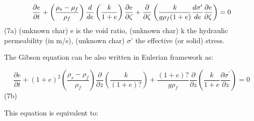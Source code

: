\begin{equation*}
\dfrac{\partial e}{\partial t} +\left( \dfrac{\rho _{s} -\rho _{f} }{\rho
_{f} } \right) \dfrac{d}{de} \left( \dfrac{k}{1+e} \right) \dfrac{\partial e%
}{\partial \zeta } +\dfrac{\partial }{\partial \zeta } \left( \dfrac{k}{%
g\rho _{f} (1+e)} \dfrac{d\sigma ^{\prime }}{de} \dfrac{\partial e}{\partial
\zeta } \right) =0 
\end{equation*}%
\hspace{5mm} \hspace{5mm} \hspace{5mm} \hspace{5mm} (7a)\newline
(unknown char)\hspace{5mm} e is the void ratio, \newline
(unknown char)\hspace{5mm} k the hydraulic permeability (in m/s), \newline
(unknown char)\hspace{5mm} $\sigma$' the effective (or solid) stress.

The Gibson equation can be also written in Eulerian framework as:

\begin{equation*}
\dfrac{\partial e}{\partial t} +(1+e)^{2} \left( \dfrac{\rho _{s} -\rho _{f} 
}{\rho _{f} } \right) \dfrac{\partial }{\partial z} \left( \dfrac{k}{(1+e)?}
\right) +\dfrac{(1+e)?}{g\rho _{f} } \dfrac{\partial }{\partial z} \left( 
\dfrac{k}{1+e} \dfrac{\partial \sigma ^{\prime }}{\partial z} \right) =0 
\end{equation*}%
\hspace{5mm} \hspace{5mm} \hspace{5mm} (7b)

This equation is equivalent to:

